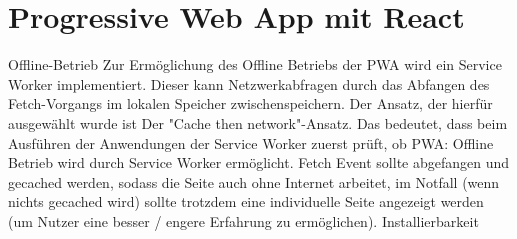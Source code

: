 \section{Progressive Web App mit React}
Offline-Betrieb
Zur Ermöglichung des Offline Betriebs der PWA wird ein Service Worker implementiert. Dieser kann Netzwerkabfragen durch das Abfangen des Fetch-Vorgangs im lokalen Speicher zwischenspeichern. Der Ansatz, der hierfür ausgewählt wurde ist Der "Cache then network"-Ansatz. Das bedeutet, dass beim Ausführen der Anwendungen der Service Worker zuerst prüft, ob 
PWA: Offline Betrieb wird durch Service Worker ermöglicht. Fetch Event sollte abgefangen und gecached werden, sodass die Seite auch ohne Internet arbeitet, im Notfall (wenn nichts gecached wird) sollte trotzdem eine individuelle Seite angezeigt werden (um Nutzer eine besser / engere Erfahrung zu ermöglichen). 
Installierbarkeit

